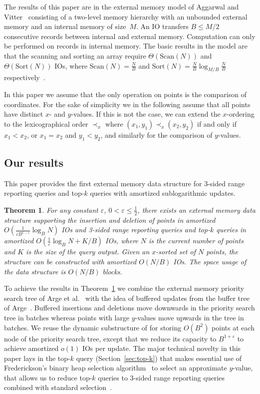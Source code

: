 \documentclass[11pt]{article}
\newcommand{\Sort}{\mathrm{Sort}}
\newcommand{\Scan}{\mathrm{Scan}}
\newtheorem{theorem}{Theorem}
\begin{document}
The results of this paper are in the external memory model of Aggarwal
and Vitter~\cite{av88} consisting of a two-level memory hierarchy with
an unbounded external memory and an internal memory of size~$M$. An IO
transfers $B\leq M/2$ consecutive records between internal and
external memory. Computation can only be performed on records in
internal memory. The basic results in the model are that the scanning
and sorting an array require $\Theta(\Scan(N))$ and $\Theta(\Sort(N))$
IOs, where $\Scan(N)=\frac{N}{B}$ and $\Sort(N) =\frac{N}{B}\log_{M/B}
\frac{N}{B}$respectively~\cite{av88}.

In this paper we assume that the only operation on points is the
comparison of coordinates.  For the sake of simplicity we in the
following assume that all points have distinct $x$- and $y$-values.
If this is not the case, we can extend the $x$-ordering to the
lexicographical order $\prec_x$ where $(x_1,y_1)\prec_x(x_2,y_2)$ if
and only if $x_1<x_2$, or $x_1=x_2$ and $y_1<y_2$, and similarly for
the comparison of $y$-values.

\subsection{Our results}

This paper provides the first external memory data structure for
3-sided range reporting queries and top-$k$ queries with amortized
sublogarithmic updates.

\begin{theorem}
\label{thm:main}
  For any constant $\varepsilon$, $0<\varepsilon\leq\frac{1}{2}$,
  there exists an external memory data structure supporting the
  insertion and deletion of points in amortized
  $O(\frac{1}{\varepsilon B^{1-\varepsilon}}\log_B N)$ IOs and 3-sided
  range reporting queries and top-$k$ queries in amortized
  $O(\frac{1}{\varepsilon}\log_B N+K/B)$ IOs, where $N$ is the current
  number of points and $K$ is the size of the query output.  Given an
  $x$-sorted set of $N$ points, the structure can be constructed with
  amortized $O(N/B)$ IOs.  The space usage of the data structure is
  $O(N/B)$ blocks.
\end{theorem}

To achieve the results in Theorem~\ref{thm:main} we combine the
external memory priority search tree of Arge et al.~\cite{pods99asv}
with the idea of buffered updates from the buffer tree of
Arge~\cite{a03}.  Buffered insertions and deletions move downwards in
the priority search tree in batches whereas points with large
$y$-values move upwards in the tree in batches.  We reuse the dynamic
substructure of \cite{pods99asv} for storing $O(B^2)$ points at each
node of the priority search tree, except that we reduce its capacity
to $B^{1+\varepsilon}$ to achieve amortized $o(1)$ IOs per update.
The major technical novelty in this paper lays in the top-$k$ query
(Section~\ref{sec:top-k}) that makes essential use of Frederickson's
binary heap selection algorithm~\cite{f93} to select an approximate
$y$-value, that allows us to reduce top-$k$ queries to 3-sided range
reporting queries combined with standard selection~\cite{bfprt73}.
\end{document}
